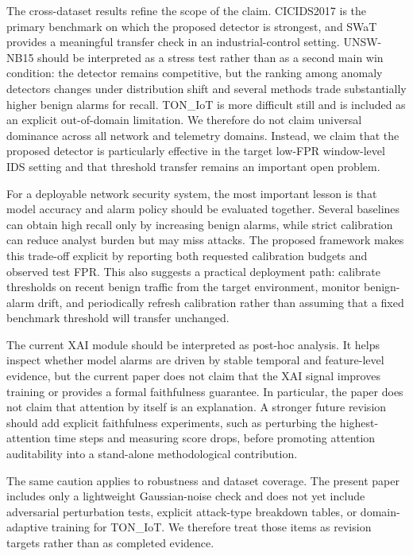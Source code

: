 \documentclass[conference]{IEEEtran}
\begin{document}
The cross-dataset results refine the scope of the claim. CICIDS2017 is the primary benchmark on which the proposed detector is strongest, and SWaT provides a meaningful transfer check in an industrial-control setting. UNSW-NB15 should be interpreted as a stress test rather than as a second main win condition: the detector remains competitive, but the ranking among anomaly detectors changes under distribution shift and several methods trade substantially higher benign alarms for recall. TON\_IoT is more difficult still and is included as an explicit out-of-domain limitation. We therefore do not claim universal dominance across all network and telemetry domains. Instead, we claim that the proposed detector is particularly effective in the target low-FPR window-level IDS setting and that threshold transfer remains an important open problem.

For a deployable network security system, the most important lesson is that model accuracy and alarm policy should be evaluated together. Several baselines can obtain high recall only by increasing benign alarms, while strict calibration can reduce analyst burden but may miss attacks. The proposed framework makes this trade-off explicit by reporting both requested calibration budgets and observed test FPR. This also suggests a practical deployment path: calibrate thresholds on recent benign traffic from the target environment, monitor benign-alarm drift, and periodically refresh calibration rather than assuming that a fixed benchmark threshold will transfer unchanged.

The current XAI module should be interpreted as post-hoc analysis. It helps inspect whether model alarms are driven by stable temporal and feature-level evidence, but the current paper does not claim that the XAI signal improves training or provides a formal faithfulness guarantee. In particular, the paper does not claim that attention by itself is an explanation. A stronger future revision should add explicit faithfulness experiments, such as perturbing the highest-attention time steps and measuring score drops, before promoting attention auditability into a stand-alone methodological contribution.

The same caution applies to robustness and dataset coverage. The present paper includes only a lightweight Gaussian-noise check and does not yet include adversarial perturbation tests, explicit attack-type breakdown tables, or domain-adaptive training for TON\_IoT. We therefore treat those items as revision targets rather than as completed evidence.
\end{document}
